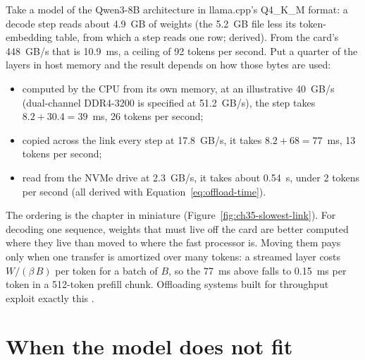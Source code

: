 Take a model of the Qwen3-8B architecture in llama.cpp's Q4\_K\_M format: a
decode step reads about 4.9~GB of weights (the 5.2~GB file less its token-embedding
table, from which a step reads one row; derived). From the card's
448~GB/s that is 10.9~ms, a ceiling of 92 tokens per second. Put a quarter of
the layers in host memory and the result depends on how those bytes are used:
\begin{itemize}
\item computed by the CPU from its own memory, at an illustrative 40~GB/s
  (dual-channel DDR4-3200 is specified at 51.2~GB/s), the step takes
  $8.2 + 30.4 = 39$~ms, 26 tokens per second;
\item copied across the link every step at 17.8~GB/s, it takes $8.2 + 68 =
  77$~ms, 13 tokens per second;
\item read from the NVMe drive at 2.3~GB/s, it takes about 0.54~s, under 2 tokens
  per second (all derived with Equation~\ref{eq:offload-time}).
\end{itemize}
The ordering is the chapter in miniature
(Figure~\ref{fig:ch35-slowest-link}). For decoding one sequence, weights
that must live off the card are better computed where they live than moved to
where the fast processor is. Moving them pays only when one transfer is
amortized over many tokens: a streamed layer costs $W/(\beta\,B)$ per token for
a batch of $B$, so the 77~ms above falls to 0.15~ms per token in a 512-token
prefill chunk. Offloading systems built for throughput exploit exactly this
\cite{sheng2023flexgen}.

\section{When the model does not fit}

